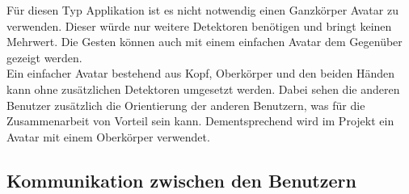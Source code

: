 \bigskip
Für diesen Typ Applikation ist es nicht notwendig einen Ganzkörper Avatar zu verwenden. Dieser würde nur weitere Detektoren benötigen und bringt keinen Mehrwert. Die Gesten können auch mit einem einfachen Avatar dem Gegenüber gezeigt werden. \\

\noindent Ein einfacher Avatar bestehend aus Kopf, Oberkörper und den beiden Händen kann ohne zusätzlichen Detektoren umgesetzt werden. Dabei sehen die anderen Benutzer zusätzlich die Orientierung der anderen Benutzern, was für die Zusammenarbeit von Vorteil sein kann. Dementsprechend wird im Projekt ein Avatar mit einem Oberkörper verwendet.

\subsection{Kommunikation zwischen den Benutzern}
\label{ch:kommunikation_zwischen_benutzern}

